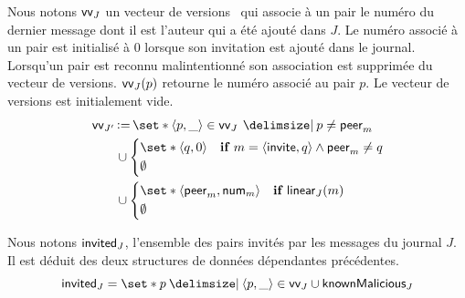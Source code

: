 Nous notons $\operatorname{\mathsf{vv}}_J$ un vecteur de versions~\autocite{parker_1983_versionvector,mattern_1988_timevector} qui associe à un pair le numéro du dernier message dont il est l'auteur qui a été ajouté dans $J$.
Le numéro associé à un pair est initialisé à $0$ lorsque son invitation est ajouté dans le journal.
Lorsqu'un pair est reconnu malintentionné son association est supprimée du vecteur de versions.
$\operatorname{\mathsf{vv}}_J(p)$ retourne le numéro associé au pair $p$.
Le vecteur de versions est initialement vide.
%
\begin{equation}\begin{split}
\MoveEqLeft\trm{vv}_{J'} \assign \set*{\tuple{p, \_} \in \trm{vv}_J \given p \neq \trm{peer}_m}\\
&\cup \begin{dcases}
        \set*{\tuple{q, 0}} & \when m = \tuple{\trm{invite}, q} \land \trm{peer}_m \neq q\\
        \emptyset &
    \end{dcases}\\
&\cup \begin{dcases}
        \set*{\tuple{\trm{peer}_m, \trm{num}_m}} & \when \trm{linear}_J(m)\\
        \emptyset &
    \end{dcases}
\end{split}\end{equation}

Nous notons $\operatorname{\mathsf{invited}}_J$, l'ensemble des pairs invités par les messages du journal $J$.
Il est déduit des deux structures de données dépendantes précédentes.
%
\begin{equation}
    \trm{invited}_{J} = \set*{p \given \tuple{p, \_} \in \trm{vv}_J} \cup \trm{knownMalicious}_J
\end{equation}


